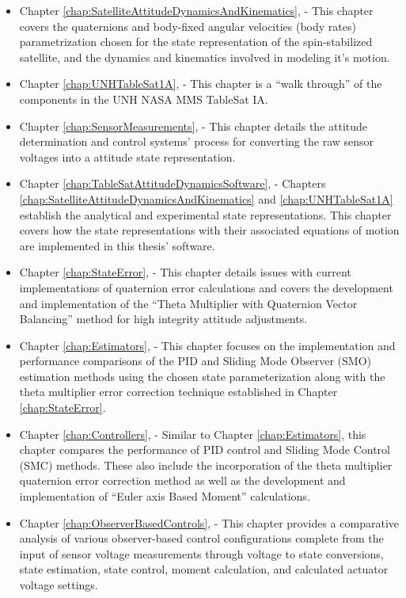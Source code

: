 \begin{itemize}
\item Chapter \ref{chap:SatelliteAttitudeDynamicsAndKinematics},  - This chapter covers the quaternions and body-fixed angular velocities (body rates) parametrization chosen for the state representation of the spin-stabilized satellite, and the dynamics and kinematics involved in modeling it's motion.
\item Chapter \ref{chap:UNHTableSat1A},  - This chapter is a ``walk through'' of the components in the UNH NASA MMS TableSat IA.
\item Chapter \ref{chap:SensorMeasurements},  - This chapter details the attitude determination and control systems' process for converting the raw sensor voltages into a attitude state representation.
\item Chapter \ref{chap:TableSatAttitudeDynamicsSoftware},  - Chapters \ref{chap:SatelliteAttitudeDynamicsAndKinematics} and \ref{chap:UNHTableSat1A} establish the analytical and experimental state representations.  This chapter covers how the state representations with their associated equations of motion are implemented in this thesis' software.
\item Chapter \ref{chap:StateError},  - This chapter details issues with current implementations of quaternion error calculations and covers the development and implementation of the ``Theta Multiplier with Quaternion Vector Balancing'' method for high integrity attitude adjustments.
\item Chapter \ref{chap:Estimators},  - This chapter focuses on the implementation and performance comparisons of the PID and Sliding Mode Observer (SMO) estimation methods using the chosen state parameterization along with the theta multiplier error correction technique established in Chapter \ref{chap:StateError}.
\item Chapter \ref{chap:Controllers},  - Similar to Chapter \ref{chap:Estimators}, this chapter compares the performance of PID control and Sliding Mode Control (SMC) methods.  These also include the incorporation of the theta multiplier quaternion error correction method as well as the development and implementation of ``Euler axis Based Moment'' calculations.
\item Chapter \ref{chap:ObserverBasedControls},  - This chapter provides a comparative analysis of various observer-based control configurations complete from the input of sensor voltage measurements through voltage to state conversions, state estimation, state control, moment calculation, and calculated actuator voltage settings.

\end{itemize}
